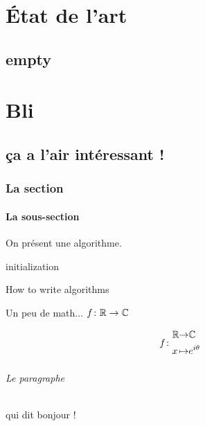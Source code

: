 \documentclass[12pt,french,a4paper]{report}
\begin{document}
\tableofcontents
\clearpage

\part{État de l'art}
\chapter{empty}

\part{Bli}
\chapter{ça a l'air intéressant !}

\section{La section}
\subsection{La sous-section}

On présent une algorithme.

\begin{algorithm}[H]
initialization\;
\caption{How to write algorithms}
\end{algorithm}

Un peu de math... $f \colon \mathbb{R} \to \mathbb{C}$

\[
f \colon \begin{alignedat}{2} &\mathbb{R} &\to &\mathbb{C}\\ &x &\mapsto &e^{i\theta} \end{alignedat}
\]

\paragraph{Le paragraphe} qui dit bonjour !

\roadMap
\end{document}
